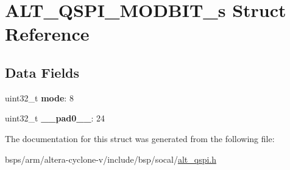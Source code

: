\hypertarget{structALT__QSPI__MODBIT__s}{}\section{A\+L\+T\+\_\+\+Q\+S\+P\+I\+\_\+\+M\+O\+D\+B\+I\+T\+\_\+s Struct Reference}
\label{structALT__QSPI__MODBIT__s}
\subsection*{Data Fields}
\begin{DoxyCompactItemize}
\item 
\mbox{\label{structALT__QSPI__MODBIT__s_a11e2cb4c321e4a3df998e6fcfb3a1729}} 
uint32\+\_\+t {\bfseries mode}\+: 8
\item 
\mbox{\label{structALT__QSPI__MODBIT__s_af481d4eb946b62ff1ec2f6f6ad8f2621}} 
uint32\+\_\+t {\bfseries \+\_\+\+\_\+pad0\+\_\+\+\_\+}\+: 24
\end{DoxyCompactItemize}


The documentation for this struct was generated from the following file\+:\begin{DoxyCompactItemize}
\item 
bsps/arm/altera-\/cyclone-\/v/include/bsp/socal/\mbox{\hyperlink{include_2bsp_2socal_2alt__qspi_8h}{alt\+\_\+qspi.\+h}}\end{DoxyCompactItemize}
